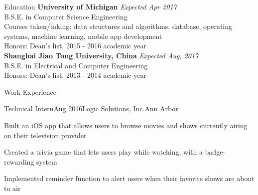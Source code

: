 \documentclass{resume} %
\begin{document}

\begin{rSection}{Education}
{\bf University of Michigan} \hfill {\em Expected Apr 2017} \\ 
B.S.E. in Computer Science Engineering\\
Courses taken/taking: data structures and algorithms, database, operating systems, machine learning, mobile app development\\
Honors: Dean's list, 2015 - 2016 academic year\\
{\bf Shanghai Jiao Tong University, China} \hfill {\em Expected Aug, 2017} \\ 
B.S.E. in Electrical and Computer Engineering \\
Honors: Dean's list, 2013 - 2014 academic year

\end{rSection}

\begin{rSection}{Work Experience}
	\begin{rSubsection}{Technical Intern}{Aug 2016}{Logic Solutions, Inc.}{Ann Arbor}
	\item Built an iOS app that allows users to browse movies and shows currently airing on their television provider
	\item Created a trivia game that lets users play while watching, with a badge-rewarding system
	\item Implemented reminder function to alert users when their favorite shows are about to air
	\end{rSubsection}
\end{rSection}
\end{document}
